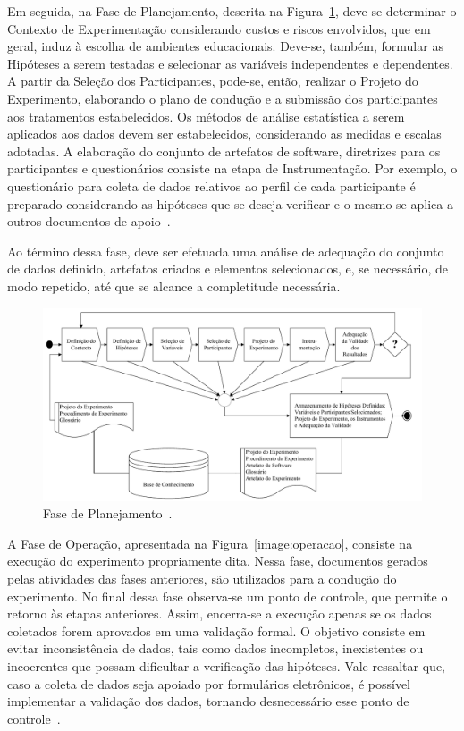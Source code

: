 Em seguida, na Fase de Planejamento, descrita na Figura~\ref{image:planejamento}, deve-se determinar o Contexto de Experimentação considerando custos e riscos envolvidos, que em geral, induz à escolha de ambientes educacionais. Deve-se, também, formular as Hipóteses a serem testadas e selecionar as variáveis independentes e dependentes. A partir da Seleção dos Participantes, pode-se, então, realizar o Projeto do Experimento, elaborando o plano de condução e a submissão dos participantes aos tratamentos estabelecidos. Os métodos de análise estatística a serem aplicados aos dados devem ser estabelecidos, considerando as medidas e escalas adotadas. A elaboração do conjunto de artefatos de software, diretrizes para os participantes e questionários consiste na etapa de Instrumentação. Por exemplo, o questionário para coleta de dados relativos ao perfil de cada participante é preparado considerando as hipóteses que se deseja verificar e o mesmo se aplica a outros documentos de apoio~\cite{Garcia06}. 

Ao término dessa fase, deve ser efetuada uma análise de adequação do conjunto de dados definido, artefatos criados e elementos selecionados, e, se necessário, de modo repetido, até que se alcance a completitude necessária.

\begin{figure}[!htb]
\centering
\includegraphics[width=\textwidth]{images/planejamento.png}
\caption{Fase de Planejamento~\cite{Garcia06}.}
\label{image:planejamento}
\end{figure}

A Fase de Operação, apresentada na Figura~\ref{image:operacao}, consiste na execução do experimento propriamente dita. Nessa fase, documentos gerados pelas atividades das fases anteriores, são utilizados para a condução do experimento. No final dessa fase observa-se um ponto de controle, que permite o retorno às etapas anteriores. Assim, encerra-se a execução apenas se os dados coletados forem aprovados em uma validação formal. O objetivo consiste em evitar inconsistência de dados, tais como dados incompletos, inexistentes ou incoerentes que possam dificultar a verificação das hipóteses. Vale ressaltar que, caso a coleta de dados seja apoiado por formulários eletrônicos, é possível implementar a validação dos dados, tornando desnecessário esse ponto de controle~\cite{Garcia06}. 

